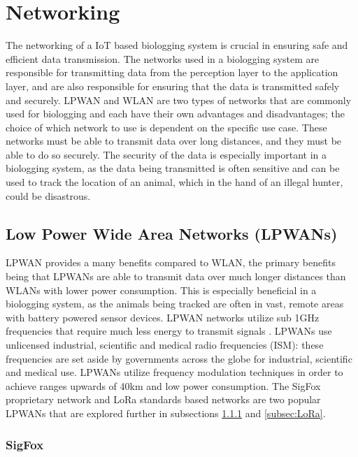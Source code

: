 \documentclass[sigplan,screen,nonacm]{acmart}
\begin{document}
\section{Networking}
\label{sec:Networking}

The networking of a IoT based biologging system is crucial in ensuring safe and
efficient data transmission. The networks used in a biologging system
are responsible for transmitting data from the perception layer to the application
layer, and are also responsible for ensuring that the data is transmitted
safely and securely. LPWAN and WLAN are two types of networks that are commonly used for 
biologging and each have their own advantages and disadvantages; the choice of which 
network to use is dependent on the specific use case. These networks must be able to transmit data over 
long distances, and they must be able to do so securely. The security 
of the data is especially important in a biologging system, as the data being 
transmitted is often sensitive and can be used to track the location of an animal, 
which in the hand of an illegal hunter, could be disastrous.

\subsection{Low Power Wide Area Networks (LPWANs)}
\label{subsec:Low Power Wide Area Networks (LPWANs)}

LPWAN provides a many benefits compared to WLAN, 
the primary benefits being that LPWANs are able to transmit data over much 
longer distances than WLANs with lower power consumption. This is especially beneficial 
in a biologging system, as the animals being tracked are often in vast, remote areas with battery powered sensor devices. 
LPWAN networks utilize sub 1GHz frequencies that require much less energy to transmit signals \cite{yousuf2018throughput}. LPWANs use 
unlicensed industrial, scientific and medical radio frequencies (ISM): these frequencies 
are set aside by governments across the globe for industrial, scientific and medical use. 
LPWANs utilize frequency modulation techniques in order to achieve ranges upwards of 40km and 
low power consumption. The SigFox proprietary network and LoRa standards based networks are 
two popular LPWANs that are explored further in subsections \ref{subsec:SigFox} and 
\ref{subsec:LoRa}.

\subsubsection{SigFox}
\label{subsec:SigFox}
\end{document}
